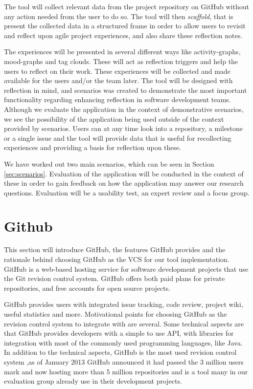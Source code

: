 The tool will collect relevant data from the project repository on GitHub without any action needed from the user to do so. The tool will then \emph{scaffold}, that is present the collected data in a structured frame in order to allow users to revisit and reflect upon agile project experiences, and also share these reflection notes.

The experiences will be presented in several different ways like activity-graphs, mood-graphs and tag clouds. These will act as reflection triggers and help the users to reflect on their work. These experiences will be collected and made available for the users and/or the team later. The tool will be designed with reflection in mind, and scenarios was created to demonstrate the most important functionality regarding enhancing reflection in software development teams. Although we evaluate the application in the context of demonstrative scenarios, we see the possibility of the application being used outside of the context provided by scenarios. Users can at any time look into a repository, a milestone or a single issue and the tool will provide data that is useful for recollecting experiences and providing a basis for reflection upon these. 

We have worked out two main scenarios, which can be seen in Section \ref{sec:scenarios}. Evaluation of the application will be conducted in the context of these in order to gain feedback on how the application may answer our research questions. Evaluation will be a usability test, an expert review and a focus group. 

\section{Github}
\label{githubchapter}
This section will introduce GitHub, the features GitHub provides and the rationale behind choosing GitHub as the VCS for our tool implementation. 
GitHub is a web-based hosting service for software development projects that use the Git revision control system\citep{git,github}. GitHub offers both paid plans for private repositories, and free accounts for open source projects.

GitHub provides users with integrated issue tracking, code review, project wiki, useful statistics and more. 
Motivational points for choosing GitHub as the revision control system to integrate with are several. Some technical aspects are that GitHub provides developers with a simple to use API\citep{githubapi}, with libraries for integration with most of the commonly used programming languages, like Java\citep{jgit}.
In addition to the technical aspects, GitHub is the most used revision control system ,as of January 2013 GitHub announced it had passed the 3 million users mark and now hosting more than 5 million repositories and is a tool many in our evaluation group already use in their development projects\citep{githubnumbers}.

